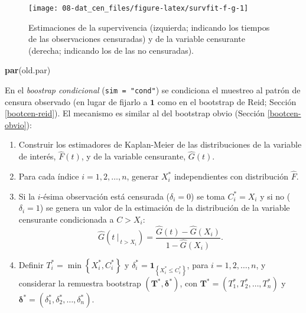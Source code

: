 \documentclass[
]{book}
\newenvironment{Shaded}{\begin{snugshade}}{\end{snugshade}}
\newcommand{\KeywordTok}[1]{\textcolor[rgb]{0.13,0.29,0.53}{\textbf{#1}}}
\newcommand{\NormalTok}[1]{#1}
\theoremstyle{break}
\theoremstyle{definition}
\theoremstyle{definition}
\theoremstyle{definition}
\theoremstyle{remark}
\begin{document}
\begin{figure}[!htb]

{\centering \texttt{[image: 08-dat\_cen\_files/figure-latex/survfit-f-g-1]} 

}

\caption{Estimaciones de la supervivencia (izquierda; indicando los tiempos de las observaciones censuradas) y de la variable censurante (derecha; indicando los de las no censuradas).}\label{fig:survfit-f-g}
\end{figure}

\begin{Shaded}
\begin{Highlighting}[]
\KeywordTok{par}\NormalTok{(old.par)}
\end{Highlighting}
\end{Shaded}

En el \emph{boostrap condicional} (\texttt{sim\ =\ "cond"}) se condiciona el muestreo al
patrón de censura observado (en lugar de fijarlo a \(\mathbf{1}\) como en el bootstrap de Reid; Sección \ref{bootcen-reid}).
El mecanismo es similar al del bootstrap obvio (Sección \ref{bootcen-obvio}):

\begin{enumerate}
\def\labelenumi{\arabic{enumi}.}
\item
  Construir los estimadores de Kaplan-Meier de las distribuciones de
  la variable de interés, \(\hat{F}\left( t \right)\), y de la variable
  censurante, \(\hat{G}\left( t \right)\).
\item
  Para cada índice \(i=1,2,\ldots ,n\), generar \(X_i^{\ast}\) independientes
  con distribución \(\hat{F}\).
\item
  Si la \(i\)-ésima observación está censurada (\(\delta_i=0\)) se toma
  \(C_i^{\ast}=X_i\) y si no (\(\delta_i=1\)) se genera un valor de la estimación
  de la distribución de la variable censurante condicionada a \(C > X_i\):
  \[\hat G \left(\left. t \ \right\vert_{\ t > X_i} \right) 
  = \frac{\hat G(t) - \hat G(X_i)}{1- \hat G(X_i)}.\]
\item
  Definir \(T_i^{\ast}=\min \left\{ X_i^{\ast},C_i^{\ast}\right\}\) y
  \(\delta_i^{\ast}=\mathbf{1}_{\left\{ X_i^{\ast}\leq C_i^{\ast}\right\}}\), para \(i = 1, 2, \ldots, n\),
  y considerar la remuestra bootstrap
  \(\left( \mathbf{T}^{\ast},\boldsymbol{\delta}^{\ast}\right)\), con
  \(\mathbf{T}^{\ast}=\left( T_1^{\ast},T_2^{\ast}, \ldots, T_n^{\ast} \right)\) y \(\boldsymbol{\delta}^{\ast} = \left( \delta_1^{\ast}, \delta_2^{\ast},\ldots ,\delta_n^{\ast} \right)\).
\end{enumerate}
\end{document}
